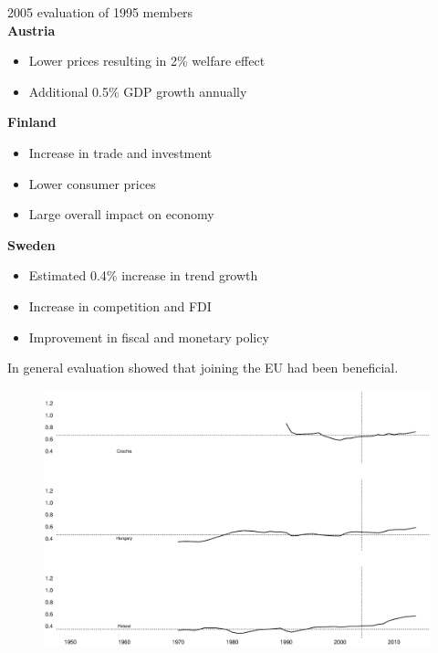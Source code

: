 \documentclass{beamer}
\begin{document}
\begin{frame}
  2005 evaluation of 1995 members  \\ \medskip
  \textbf{Austria}
  \begin{itemize}
    \item Lower prices resulting in 2\% welfare effect
    \item Additional 0.5\% GDP growth annually
  \end{itemize}
  \textbf{Finland}
  \begin{itemize}
    \item Increase in trade and investment
    \item Lower consumer prices
    \item Large overall impact on economy
  \end{itemize}
  \textbf{Sweden}
  \begin{itemize}
    \item Estimated 0.4\% increase in trend growth
    \item Increase in competition and FDI
    \item Improvement in fiscal and monetary policy
  \end{itemize}
  \medskip
  In general evaluation showed that joining the EU had been beneficial. 
\end{frame}

\begin{frame}
  \begin{figure}
    \includegraphics[scale=.3]{enlargement4.eps}
  \end{figure}
\end{frame}
\end{document}
